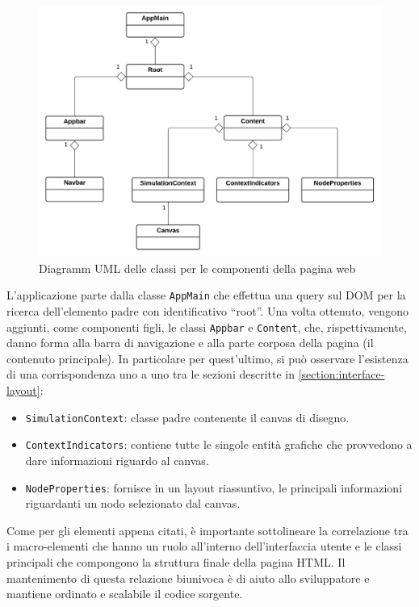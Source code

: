 \begin{figure}[htb]
	\centering
	\includegraphics[scale=0.82]{imgs/Struttura pagina web.pdf}
	\caption{Diagramm UML delle classi per le componenti della pagina web}
	\label{fig:page-structure}
\end{figure}

L'applicazione parte dalla classe \texttt{AppMain} che effettua una query sul \ac{DOM} per la ricerca dell'elemento padre con identificativo ``root''. Una volta ottenuto, vengono aggiunti, come componenti figli, le classi \texttt{Appbar} e \texttt{Content}, che, rispettivamente, danno forma alla barra di navigazione e alla parte corposa della pagina (il contenuto principale). In particolare per quest'ultimo, si può osservare l'esistenza di una corrispondenza uno a uno tra le sezioni descritte in \ref{section:interface-layout}: 
\begin{itemize}
	\item \texttt{SimulationContext}: classe padre contenente il canvas di disegno.
	\item \texttt{ContextIndicators}: contiene tutte le singole entità grafiche che provvedono a dare informazioni riguardo al canvas.
	\item \texttt{NodeProperties}: fornisce in un layout riassuntivo, le principali informazioni riguardanti un nodo selezionato dal canvas.
\end{itemize}
Come per gli elementi appena citati, è importante sottolineare la correlazione tra i macro-elementi che hanno un ruolo all'interno dell'interfaccia utente e le classi principali che compongono la struttura finale della pagina HTML. Il mantenimento di questa relazione biunivoca è di aiuto allo sviluppatore e mantiene ordinato e scalabile il codice sorgente.


